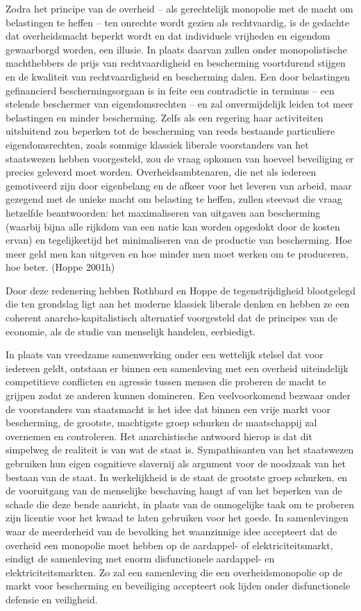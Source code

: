 \documentclass[
  a5paper,
  smalldemyvopaper,11pt,twoside,onecolumn,openright,extrafontsizes,
hidelinks]{memoir}
\begin{document}
Zodra het principe van de overheid -- als gerechtelijk monopolie met de
macht om belastingen te heffen -- ten onrechte wordt gezien als
rechtvaardig, is de gedachte dat overheidsmacht beperkt wordt en dat
individuele vrijheden en eigendom gewaarborgd worden, een illusie. In
plaats daarvan zullen onder monopolistische machthebbers de prijs van
rechtvaardigheid en bescherming voortdurend stijgen en de kwaliteit van
rechtvaardigheid en bescherming dalen. Een door belastingen gefinancierd
beschermingsorgaan is in feite een contradictie in terminus -- een
stelende beschermer van eigendomsrechten -- en zal onvermijdelijk leiden
tot meer belastingen en minder bescherming. Zelfs als een regering haar
activiteiten uitsluitend zou beperken tot de bescherming van reeds
bestaande particuliere eigendomsrechten, zoals sommige klassiek liberale
voorstanders van het staatswezen hebben voorgesteld, zou de vraag
opkomen van hoeveel beveiliging er precies geleverd moet worden.
Overheidsambtenaren, die net als iedereen gemotiveerd zijn door
eigenbelang en de afkeer voor het leveren van arbeid, maar gezegend met
de unieke macht om belasting te heffen, zullen steevast die vraag
hetzelfde beantwoorden: het maximaliseren van uitgaven aan bescherming
(waarbij bijna alle rijkdom van een natie kan worden opgeslokt door de
kosten ervan) en tegelijkertijd het minimaliseren van de productie van
bescherming. Hoe meer geld men kan uitgeven en hoe minder men moet
werken om te produceren, hoe beter. (Hoppe 2001h)

Door deze redenering hebben Rothbard en Hoppe de tegenstrijdigheid
blootgelegd die ten grondslag ligt aan het moderne klassiek liberale
denken en hebben ze een coherent anarcho-kapitalistisch alternatief
voorgesteld dat de principes van de economie, als de studie van
menselijk handelen, eerbiedigt.

In plaats van vreedzame samenwerking onder een wettelijk stelsel dat
voor iedereen geldt, ontstaan er binnen een samenleving met een overheid
uiteindelijk competitieve conflicten en agressie tussen mensen die
proberen de macht te grijpen zodat ze anderen kunnen domineren. Een
veelvoorkomend bezwaar onder de voorstanders van staatsmacht is het idee
dat binnen een vrije markt voor bescherming, de grootste, machtigste
groep schurken de maatschappij zal overnemen en controleren. Het
anarchistische antwoord hierop is dat dit simpelweg de realiteit is van
wat de staat is. Sympathisanten van het staatswezen gebruiken hun eigen
cognitieve slavernij als argument voor de noodzaak van het bestaan van
de staat. In werkelijkheid is de staat de grootste groep schurken, en de
vooruitgang van de menselijke beschaving hangt af van het beperken van
de schade die deze bende aanricht, in plaats van de onmogelijke taak om
te proberen zijn licentie voor het kwaad te laten gebruiken voor het
goede. In samenlevingen waar de meerderheid van de bevolking het
waanzinnige idee accepteert dat de overheid een monopolie moet hebben op
de aardappel- of elektriciteitsmarkt, eindigt de samenleving met enorm
disfunctionele aardappel- en elektriciteitsmarkten. Zo zal een
samenleving die een overheidsmonopolie op de markt voor bescherming en
beveiliging accepteert ook lijden onder disfunctionele defensie en
veiligheid.
\end{document}
